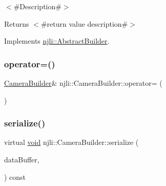 $<$\#\+Description\#$>$

\begin{DoxyReturn}{Returns}
$<$\#return value description\#$>$ 
\end{DoxyReturn}


Implements \mbox{\hyperlink{classnjli_1_1_abstract_builder_a3e6e553e06d1ca30517ad5fb0bd4d000}{njli\+::\+Abstract\+Builder}}.

\mbox{\label{classnjli_1_1_camera_builder_a25f79aa7c8c80fcd27c98d24c1af850c}} 
\subsubsection{\texorpdfstring{operator=()}{operator=()}}
{\footnotesize\ttfamily \mbox{\hyperlink{classnjli_1_1_camera_builder}{Camera\+Builder}}\& njli\+::\+Camera\+Builder\+::operator= (\begin{DoxyParamCaption}\item[{const \mbox{\hyperlink{classnjli_1_1_camera_builder}{Camera\+Builder}} \&}]{ }\end{DoxyParamCaption})\hspace{0.3cm}{\ttfamily [protected]}}

\mbox{\label{classnjli_1_1_camera_builder_a3b8bca782dfa0e89ef0eda0200c707c0}} 
\subsubsection{\texorpdfstring{serialize()}{serialize()}}
{\footnotesize\ttfamily virtual \mbox{\hyperlink{_thread_8h_af1e856da2e658414cb2456cb6f7ebc66}{void}} njli\+::\+Camera\+Builder\+::serialize (\begin{DoxyParamCaption}\item[{\mbox{\hyperlink{_thread_8h_af1e856da2e658414cb2456cb6f7ebc66}{void}} $\ast$}]{data\+Buffer,  }\item[{bt\+Serializer $\ast$}]{ }\end{DoxyParamCaption}) const\hspace{0.3cm}{\ttfamily [virtual]}}



